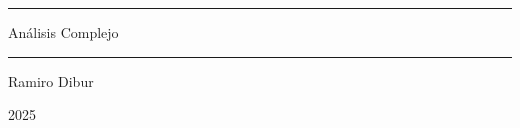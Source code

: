 \documentclass[12pt, a4paper, oneside]{book}
\theoremstyle{mdtheorem}
\theoremstyle{mddefinition}
\theoremstyle{remark}
\begin{document}
\frontmatter

\begin{titlepage}
    \begin{center}
        \vspace*{1cm}
        
        \sffamily
        \bfseries
        \textcolor{primarycolor}{\rule{\linewidth}{2pt}}
        \vspace{0.4cm}
        
        {\Huge Análisis Complejo \par}
        
        \vspace{0.4cm}
        \textcolor{primarycolor}{\rule{\linewidth}{2pt}}
        
        \vspace{2cm}
        
        {\Large Ramiro Dibur \par}
        \vspace{1cm}
        {\large 2025 \par}
    \end{center}
\end{titlepage}



\tableofcontents


\mainmatter






\end{document}
